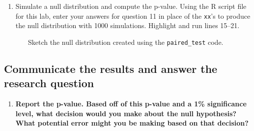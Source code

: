 \documentclass[
]{report}
\newenvironment{Shaded}{\begin{snugshade}}{\end{snugshade}}
\newcommand{\AttributeTok}[1]{\textcolor[rgb]{0.77,0.63,0.00}{#1}}
\newcommand{\CommentTok}[1]{\textcolor[rgb]{0.56,0.35,0.01}{\textit{#1}}}
\newcommand{\DecValTok}[1]{\textcolor[rgb]{0.00,0.00,0.81}{#1}}
\newcommand{\FunctionTok}[1]{\textcolor[rgb]{0.00,0.00,0.00}{#1}}
\newcommand{\NormalTok}[1]{#1}
\newcommand{\SpecialCharTok}[1]{\textcolor[rgb]{0.00,0.00,0.00}{#1}}
\newcommand{\StringTok}[1]{\textcolor[rgb]{0.31,0.60,0.02}{#1}}
\providecommand{\tightlist}{%
  \setlength{\itemsep}{0pt}\setlength{\parskip}{0pt}}
\begin{document}
\vspace{.2in}

\begin{enumerate}
\def\labelenumi{\arabic{enumi}.}
\setcounter{enumi}{11}
\tightlist
\item
  Simulate a null distribution and compute the p-value. Using the R script file for this lab, enter your answers for question 11 in place of the \texttt{xx}'s to produce the null distribution with 1000 simulations. Highlight and run lines 15--21.
\end{enumerate}

\begin{Shaded}
\end{Shaded}

~~~~~~~Sketch the null distribution created using the \texttt{paired\_test} code.

\vspace{1.5in}

\hypertarget{communicate-the-results-and-answer-the-research-question-3}{%
\subsection*{Communicate the results and answer the research question}\label{communicate-the-results-and-answer-the-research-question-3}}

\begin{enumerate}
\def\labelenumi{\arabic{enumi}.}
\setcounter{enumi}{12}
\tightlist
\item
  \textbf{Report the p-value. Based off of this p-value and a 1\% significance level, what decision would you make about the null hypothesis? What potential error might you be making based on that decision?}
\end{enumerate}
\end{document}
